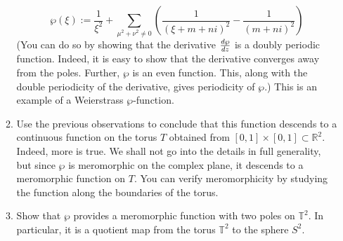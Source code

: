 \documentclass[notoc,notitlepage]{tufte-book}
\begin{document}
\begin{enumerate}
\begin{enumerate}
        \begin{equation*}
          \wp(\xi) := \frac{1}{\xi^2} +
            \sum_{\mu^2 + \nu^2 \neq 0} \left( \frac{1}{(\xi + m + n i)^2} 
              - \frac{1}{(m + ni)^2} \right)
        \end{equation*}
        (You can do so by showing that the derivative $\frac{\mathop{}\!d{\wp}}{\mathop{}\!d{z}}$ is a doubly
        periodic function. Indeed, it is easy to show that the derivative converges away from
        the poles. Further, $\wp$ is an even function. This, along with the double periodicity
        of the derivative, gives periodicity of $\wp$.) This is an example of a Weierstrass
        $\wp$-function.
      \item Use the previous observations to conclude that this function descends to a continuous
        function on the torus $T$ obtained from $[0, 1] \times [0, 1] \subset \mathbb{R}^2$.
        Indeed, more is true. We shall not go into the details in full generality, but since $\wp$
        is meromorphic on the complex plane, it descends to a meromorphic function on $T$. You
        can verify meromorphicity by studying the function along the boundaries of the torus.
      \item Show that $\wp$ provides a meromorphic function with two poles on $\mathbb{T}^2$. In
        particular, it is a quotient map from the torus $\mathbb{T}^2$ to the sphere $S^2$.
    \end{enumerate}
\end{enumerate}



\backmatter

\pagestyle{plain}

\nobibliography*


\printindex
\end{document}
